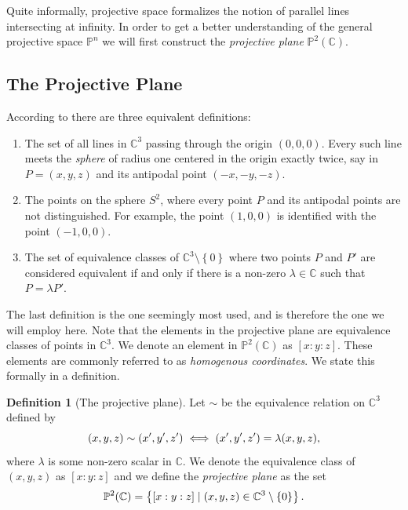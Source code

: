 \documentclass[a4paper]{article}
\theoremstyle{definition}
\newtheorem{defn}{Definition}
\theoremstyle{plain}
\newcommand{\C}{\ensuremath{\mathbb{C}}}
\newcommand{\proj}{\ensuremath{\mathbb{P}}}
\begin{document}
    Quite informally, projective space formalizes the notion of parallel lines
    intersecting at infinity. In order to get a better understanding of the
    general projective space $\proj^n$ we will first construct the
    \emph{projective plane} $\proj^2(\C)$.

    \subsection{The Projective Plane}
    \label{sub:the_projective_plane}
    
    According to \cite{Wik16} there are three equivalent definitions:
    \begin{enumerate}
        \item The set of all lines in $\C^3$ passing through the origin $(0, 0,
            0)$. Every such line meets the \emph{sphere} of radius one centered
            in the origin exactly twice, say in $P = (x, y, z)$ and its
            antipodal point $(-x, -y, -z)$.

        \item\label{item:sphere} The points on the sphere $S^2$, where every point $P$ and its
            antipodal points are not distinguished. For example, the point $(1,
            0, 0)$ is identified with the point $(-1, 0, 0)$.

        \item The set of equivalence classes of $\C^3 \setminus \left\{ 0
            \right\}$ where two points $P$ and $P'$ are considered equivalent
            if and only if there is a non-zero $\lambda \in \C$ such that $P =
            \lambda P'$.
    \end{enumerate}

    The last definition is the one seemingly most used, and is therefore the
    one we will employ here. Note that the elements in the projective plane are
    equivalence classes of points in $\C^3$. We denote an element in
    $\proj^2(\C)$ as $\left[ x : y : z \right]$. These elements are commonly
    referred to as \emph{homogenous coordinates}. We state this formally in a
    definition.

    \begin{defn}[The projective plane]
        Let $\sim$ be the equivalence relation on $\C^3$ defined by
        \begin{equation}
            \notag
            (x, y, z) \sim (x', y', z') \iff (x', y', z') = \lambda(x, y, z),
        \end{equation}
        where $\lambda$ is some non-zero scalar in $\C$. We denote the
        equivalence class of $(x, y, z)$ as $\left[ x : y : z \right]$ and we
        define the \emph{projective plane} as the set
        \begin{equation}
            \notag
            \proj^2(\C) = \left\{ \left[ x : y : z \right] \mid (x, y, z) \in
            \C^3 \setminus \left\{ 0 \right\}\right\}.
        \end{equation}
    \end{defn}
\end{document}

